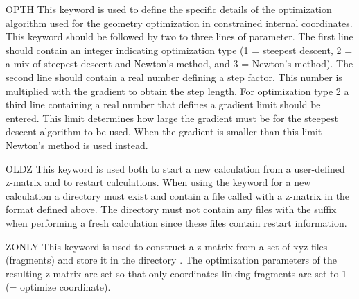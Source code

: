 \begin{keywordlist}
\item[OPTH]
This keyword is used to define the specific details of the optimization algorithm used
for the geometry optimization in constrained internal coordinates.
This keyword should be followed by two to three lines of parameter. The first line should
contain an integer indicating optimization type (1 = steepest descent, 2 = a mix of
steepest descent and Newton's method, and 3 = Newton's method). The second line
should contain a real number defining a step factor.
 This number is multiplied with the gradient to obtain the step length.
For optimization type 2 a third line containing a real number that defines a gradient limit
 should be entered. This limit determines how large the gradient must be for the steepest
descent algorithm to be used. When the gradient is smaller than this limit Newton's method
is used instead.

\item[OLDZ]
This keyword is used both to start a new calculation from a user-defined z-matrix and
 to restart calculations. When using the keyword for a new calculation a directory
  must exist and contain a file called  with a z-matrix in
 the format defined above. The directory must not contain any files with the suffix 
when performing a fresh calculation since these files contain restart information.

\item[ZONLY]
This keyword is used to construct a z-matrix from a set of xyz-files (fragments)
 and store it in the directory . The optimization parameters
 of the resulting z-matrix are set so that only coordinates linking fragments are
set to 1 (= optimize coordinate).


\end{keywordlist}

